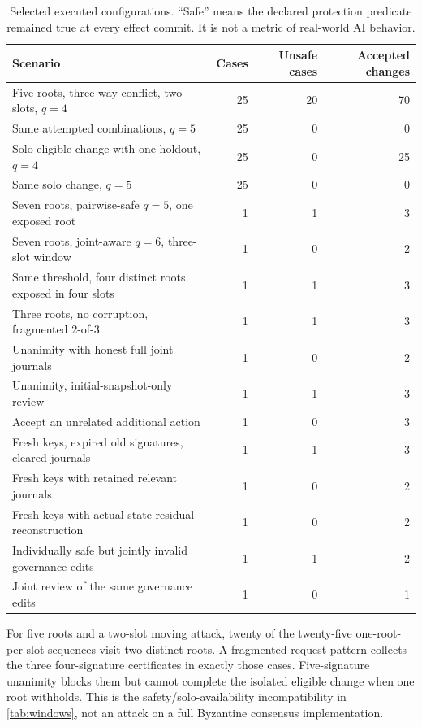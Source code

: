 \documentclass[11pt,a4paper]{article}
\theoremstyle{definition}\newtheorem{definition}{Definition}
\begin{document}
\begin{table}[t]\centering\small
\caption{Selected executed configurations. ``Safe'' means the declared protection predicate remained true at every effect commit. It is not a metric of real-world AI behavior.}
\label{tab:experiments}
\begin{tabularx}{\linewidth}{@{}Xrrr@{}}\toprule
Scenario & Cases & Unsafe cases & Accepted changes\\\midrule
Five roots, three-way conflict, two slots, $q=4$ &25&20&70\\
Same attempted combinations, $q=5$ &25&0&0\\
Solo eligible change with one holdout, $q=4$ &25&0&25\\
Same solo change, $q=5$ &25&0&0\\
Seven roots, pairwise-safe $q=5$, one exposed root &1&1&3\\
Seven roots, joint-aware $q=6$, three-slot window &1&0&2\\
Same threshold, four distinct roots exposed in four slots &1&1&3\\
Three roots, no corruption, fragmented $2$-of-$3$ &1&1&3\\
Unanimity with honest full joint journals &1&0&2\\
Unanimity, initial-snapshot-only review &1&1&3\\
Accept an unrelated additional action &1&0&3\\
Fresh keys, expired old signatures, cleared journals &1&1&3\\
Fresh keys with retained relevant journals &1&0&2\\
Fresh keys with actual-state residual reconstruction &1&0&2\\
Individually safe but jointly invalid governance edits &1&1&2\\
Joint review of the same governance edits &1&0&1\\\bottomrule
\end{tabularx}
\end{table}
For five roots and a two-slot moving attack, twenty of the twenty-five one-root-per-slot sequences visit two distinct roots. A fragmented request pattern collects the three four-signature certificates in exactly those cases. Five-signature unanimity blocks them but cannot complete the isolated eligible change when one root withholds. This is the safety/solo-availability incompatibility in \cref{tab:windows}, not an attack on a full Byzantine consensus implementation.
\end{document}
